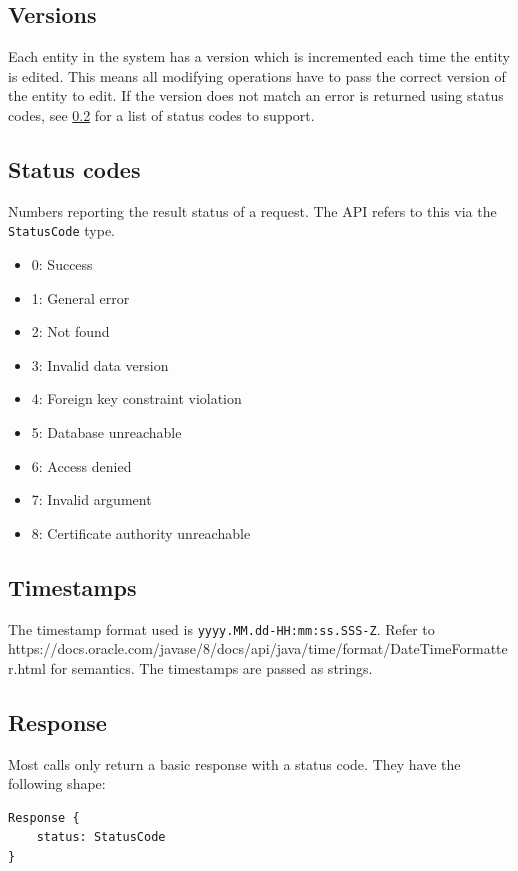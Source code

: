 \documentclass[12pt]{report}
\begin{document}
\subsection{Versions}

Each entity in the system has a version which is incremented each
time the entity is edited. This means all modifying operations have
to pass the correct version of the entity to edit. If the version does
not match an error is returned using status codes, see \ref{status-codes}
for a list of status codes to support.

\subsection{Status codes}\label{status-codes}

Numbers reporting the result status of a request. The API refers to this
via the \texttt{StatusCode} type.

\begin{itemize}
\item 0: Success
\item 1: General error
\item 2: Not found
\item 3: Invalid data version
\item 4: Foreign key constraint violation
\item 5: Database unreachable
\item 6: Access denied
\item 7: Invalid argument
\item 8: Certificate authority unreachable
\end{itemize}

\subsection{Timestamps}

The timestamp format used is \texttt{yyyy.MM.dd-HH:mm:ss.SSS-Z}. Refer to\\
https://docs.oracle.com/javase/8/docs/api/java/time/format/DateTimeFormatter.html
for semantics. The timestamps are passed as strings.

\subsection{Response}
Most calls only return a basic response with a status code. They have the
following shape:
\begin{lstlisting}
Response {
    status: StatusCode
}
\end{lstlisting}
\end{document}
